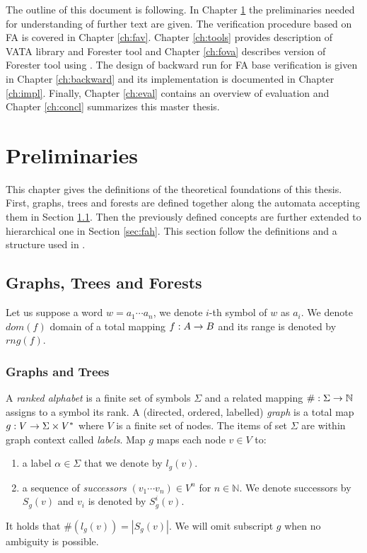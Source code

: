 The outline of this document is following.
In Chapter \ref{ch:prel} the preliminaries needed for understanding of further text are given.
The verification procedure based on FA is covered in Chapter \ref{ch:fav}.
Chapter \ref{ch:tools} provides description of VATA library and Forester tool and Chapter \ref{ch:fova} describes version of Forester tool using \vata.
The design of backward run for FA base verification is given in Chapter \ref{ch:backward} and its implementation is documented
in Chapter \ref{ch:impl}.
Finally, Chapter \ref{ch:eval} contains an overview of evaluation and Chapter \ref{ch:concl} summarizes this master thesis.

\chapter{Preliminaries}
\label{ch:prel}

This chapter gives the definitions of the theoretical foundations of this thesis.
First, graphs, trees and forests are defined together along the automata accepting them in Section \ref{sec:graph}.
Then the previously defined concepts are further extended to hierarchical one in Section \ref{sec:fah}.
This section follow the definitions and a structure used in \cite{techrep}.

\section{Graphs, Trees and Forests}
\label{sec:graph}

Let us suppose a word $w = a_1 \cdots a_n$, we denote $i$-th symbol of $w$ as $a_i$.
We denote $dom(f)$ domain of a total mapping $f: A \rightarrow B$ and its range is denoted by $rng(f)$.

\subsection{Graphs and Trees}
\label{subsec:graph}
A \emph{ranked alphabet} is a finite set of symbols $\Sigma$ and a related mapping $\#: \Sigma \rightarrow \mathbb{N}$
assigns to a symbol its rank.
A (directed, ordered, labelled) \emph{graph} is a total map $g: V \rightarrow \Sigma \times V^{*}$ where $V$ is a finite set of nodes.
The items of set $\Sigma$ are within graph context called \emph{labels}.
Map $g$ maps each node $v\in V$ to:
\begin{enumerate}
	\item a label $\alpha \in \Sigma$ that we denote by $l_g(v)$.
	\item a sequence of \emph{successors} $(v_1 \cdots v_n) \in V^n$ for $n \in \mathbb{N}$.
		We denote successors by $S_g(v)$ and $v_i$ is denoted by $S^i_g(v)$.
\end{enumerate}
It holds that $\#(l_g(v)) = |S_g(v)|$.
We will omit subscript $g$ when no ambiguity is possible.

